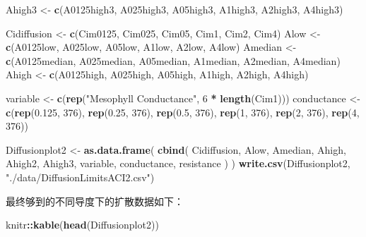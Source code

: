 \documentclass[
]{krantz}
\makeatletter
\newenvironment{Shaded}{\begin{snugshade}}{\end{snugshade}}
\newcommand{\DecValTok}[1]{\textcolor[rgb]{0.00,0.00,0.81}{#1}}
\newcommand{\FloatTok}[1]{\textcolor[rgb]{0.00,0.00,0.81}{#1}}
\newcommand{\KeywordTok}[1]{\textcolor[rgb]{0.13,0.29,0.53}{\textbf{#1}}}
\newcommand{\NormalTok}[1]{#1}
\newcommand{\OperatorTok}[1]{\textcolor[rgb]{0.81,0.36,0.00}{\textbf{#1}}}
\newcommand{\StringTok}[1]{\textcolor[rgb]{0.31,0.60,0.02}{#1}}
\newenvironment{kframe}{%
\medskip{}
\setlength{\fboxsep}{.8em}
 \def\at@end@of@kframe{}%
 \ifinner\ifhmode%
  \def\at@end@of@kframe{\end{minipage}}%
  \begin{minipage}{\columnwidth}%
 \fi\fi%
 \def\FrameCommand##1{\hskip\@totalleftmargin \hskip-\fboxsep
 \colorbox{shadecolor}{##1}\hskip-\fboxsep
     \hskip-\linewidth \hskip-\@totalleftmargin \hskip\columnwidth}%
 \MakeFramed {\advance\hsize-\width
   \@totalleftmargin\z@ \linewidth\hsize
   \@setminipage}}%
 {\par\unskip\endMakeFramed%
 \at@end@of@kframe}
\renewenvironment{Shaded}{\begin{kframe}}{\end{kframe}}
\makeatother
\begin{document}
\begin{Shaded}
\begin{Highlighting}[]
\NormalTok{Ahigh3 <-}
\StringTok{  }\KeywordTok{c}\NormalTok{(A0125high3, A025high3, A05high3, A1high3, A2high3, A4high3)}

\NormalTok{Cidiffusion <-}\StringTok{ }\KeywordTok{c}\NormalTok{(Cim0125, Cim025, Cim05, Cim1, Cim2, Cim4)}
\NormalTok{Alow <-}\StringTok{ }\KeywordTok{c}\NormalTok{(A0125low, A025low, A05low, A1low, A2low, A4low)}
\NormalTok{Amedian <-}
\StringTok{  }\KeywordTok{c}\NormalTok{(A0125median,}
\NormalTok{    A025median,}
\NormalTok{    A05median,}
\NormalTok{    A1median,}
\NormalTok{    A2median,}
\NormalTok{    A4median)}
\NormalTok{Ahigh <-}\StringTok{ }\KeywordTok{c}\NormalTok{(A0125high, A025high, A05high, A1high, A2high, A4high)}

\NormalTok{variable <-}\StringTok{ }\KeywordTok{c}\NormalTok{(}\KeywordTok{rep}\NormalTok{(}\StringTok{"Mesophyll Conductance"}\NormalTok{, }\DecValTok{6} \OperatorTok{*}\StringTok{ }\KeywordTok{length}\NormalTok{(Cim1)))}
\NormalTok{conductance <-}
\StringTok{  }\KeywordTok{c}\NormalTok{(}\KeywordTok{rep}\NormalTok{(}\FloatTok{0.125}\NormalTok{, }\DecValTok{376}\NormalTok{),}
    \KeywordTok{rep}\NormalTok{(}\FloatTok{0.25}\NormalTok{, }\DecValTok{376}\NormalTok{),}
    \KeywordTok{rep}\NormalTok{(}\FloatTok{0.5}\NormalTok{, }\DecValTok{376}\NormalTok{),}
    \KeywordTok{rep}\NormalTok{(}\DecValTok{1}\NormalTok{, }\DecValTok{376}\NormalTok{),}
    \KeywordTok{rep}\NormalTok{(}\DecValTok{2}\NormalTok{, }\DecValTok{376}\NormalTok{),}
    \KeywordTok{rep}\NormalTok{(}\DecValTok{4}\NormalTok{, }\DecValTok{376}\NormalTok{))}

\NormalTok{Diffusionplot2 <-}
\StringTok{  }\KeywordTok{as.data.frame}\NormalTok{(}
    \KeywordTok{cbind}\NormalTok{(}
\NormalTok{      Cidiffusion,}
\NormalTok{      Alow,}
\NormalTok{      Amedian,}
\NormalTok{      Ahigh,}
\NormalTok{      Ahigh2,}
\NormalTok{      Ahigh3,}
\NormalTok{      variable,}
\NormalTok{      conductance,}
\NormalTok{      resistance}
\NormalTok{    )}
\NormalTok{  )}
\KeywordTok{write.csv}\NormalTok{(Diffusionplot2, }\StringTok{"./data/DiffusionLimitsACI2.csv"}\NormalTok{)}
\end{Highlighting}
\end{Shaded}

最终够到的不同导度下的扩散数据如下：

\begin{Shaded}
\begin{Highlighting}[]
\NormalTok{knitr}\OperatorTok{::}\KeywordTok{kable}\NormalTok{(}\KeywordTok{head}\NormalTok{(Diffusionplot2))}
\end{Highlighting}
\end{Shaded}
\end{document}
